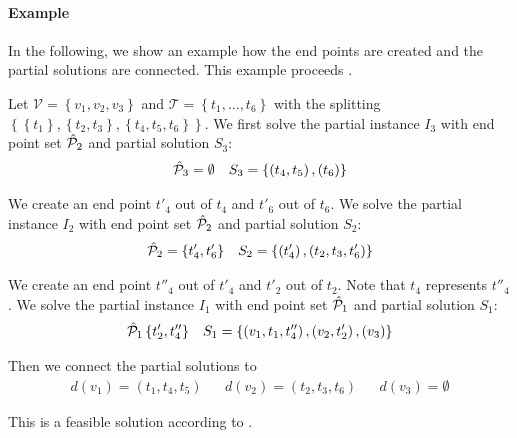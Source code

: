 \paragraph{Example} \parfill

In the following, we show an example how the end points are created and the partial solutions are connected. This example proceeds .

\begin{example}

Let ${\mathcal{V}=\left\{v_1,v_2,v_3\right\}}$ and ${\mathcal{T}=\left\{t_1,\dots,t_6\right\}}$ with the splitting $\left\{\left\{t_1\right\},\left\{t_2,t_3\right\},\left\{t_4,t_5,t_6\right\}\right\}$. We first solve the partial instance $I_3$ with end point set $\hat{\mathcal{P}}_2$ and partial solution $S_3$:
\begin{align*}
	\hat{\mathcal{P}}_3 = \emptyset && S_3 = \left\{\left(t_4, t_5\right), \left(t_6\right)\right\}
\end{align*}

We create an end point $t'_4$ out of $t_4$ and $t'_6$ out of $t_6$. We solve the partial instance $I_2$ with end point set $\hat{\mathcal{P}}_2$ and partial solution $S_2$:
\begin{align*}
	\hat{\mathcal{P}}_2 = \left\{t'_4,t'_6\right\} && S_2 = \left\{\left(t'_4\right), \left(t_2,t_3,t'_6\right)\right\}
\end{align*}

We create an end point $t''_4$ out of $t'_4$ and $t'_2$ out of $t_2$. Note that $t_4$ represents $t''_4$. We solve the partial instance $I_1$ with end point set $\hat{\mathcal{P}}_1$ and partial solution $S_1$:
\begin{align*}
	\hat{\mathcal{P}}_1\left\{t'_2,t''_4\right\} && S_1 = \left\{\left(v_1,t_1,t''_4\right), \left(v_2,t'_2\right), \left(v_3\right)\right\}
\end{align*}

Then we connect the partial solutions to 
\begin{align*}
	d\left(v_1\right) = \left(t_1,t_4,t_5\right) && d\left(v_2\right) = \left(t_2,t_3,t_6\right) && d\left(v_3\right) = \emptyset
\end{align*}

This is a feasible solution according to .

\end{example}


